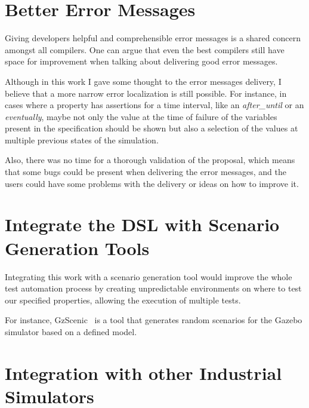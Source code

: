\section{Better Error Messages}
\label{sec:bettererrormsg}

Giving developers helpful and comprehensible error messages is a shared concern amongst all compilers. One can argue that even the best compilers still have space for improvement when talking about delivering good error messages.

Although in this work I gave some thought to the error messages delivery, I believe that a more narrow error localization is still possible. For instance, in cases where a property has assertions for a time interval, like an \textit{after\_until} or an \textit{eventually}, maybe not only the value at the time of failure of the variables present in the specification should be shown but also a selection of the values at multiple previous states of the simulation.

Also, there was no time for a thorough validation of the proposal, which means that some bugs could be present when delivering the error messages, and the users could have some problems with the delivery or ideas on how to improve it.


\section{Integrate the DSL with Scenario Generation Tools}
\label{sec:integratescenario}

Integrating this work with a scenario generation tool would improve the whole test automation process by creating unpredictable environments on where to test our specified properties, allowing the execution of multiple tests.

For instance, GzScenic~\cite{AfzalGzScenic} is a tool that generates random scenarios for the Gazebo simulator based on a defined model.


\section{Integration with other Industrial Simulators}
\label{sec:integratesimulators}

